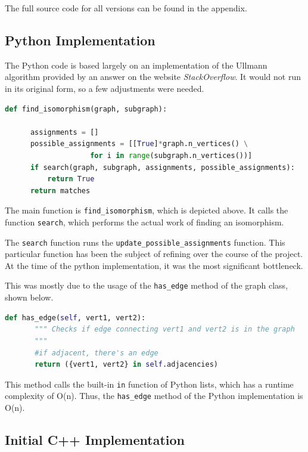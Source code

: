 \documentclass{article}
\begin{document}
The full source code for all versions can be found in the appendix.

  \subsection{Python Implementation}
  The Python code is based largely on an implementation of the Ullmann algorithm provided by an answer on the website \textit{StackOverflow}.\cite{pyiso} It would not run in its original form, so a few adjustments were needed.

  \begin{lstlisting}[language=Python,caption={Function used to determine whether an isomorphism exists.}]
  def find_isomorphism(graph, subgraph):

      assignments = []
      possible_assignments = [[True]*graph.n_vertices() \
                    for i in range(subgraph.n_vertices())]
      if search(graph, subgraph, assignments, possible_assignments):
          return True
      return matches
  \end{lstlisting}

  The main function is \texttt{find\_isomorphism}, which is depicted above. It calls the function \texttt{search}, which performs the actual work of finding an isomorphism.

  The \texttt{search} function runs  the \texttt{update\_possible\_assignments} function. This particular function has been the subject of refining over the course of the project. At the time of the python implementation, it was the most significant bottleneck.

  This was mostly due to the usage of the \texttt{has\_edge} method of the graph class, shown below.

  \begin{lstlisting}[language=Python,caption={Code for the \texttt{has\_edge} method of our graph class.}]
  def has_edge(self, vert1, vert2):
       """ Checks if edge connecting vert1 and vert2 is in the graph
       """
       #if adjacent, there's an edge
       return ({vert1, vert2} in self.adjacencies)

  \end{lstlisting}

  This method calls the built-in \texttt{in} function of Python lists, which has a runtime complexity of O(n).\cite{bigopy} Thus, the \texttt{has\_edge} method of the Python implementation is O(n).

  \subsection{Initial C++ Implementation}
\end{document}
